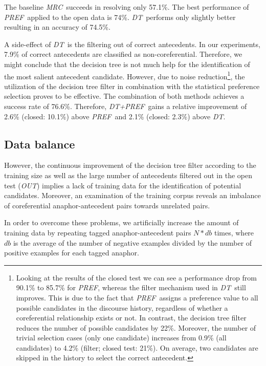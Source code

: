 The baseline {\small\em MRC}\, succeeds in resolving only 57.1\%. The best performance of 
{\small\em PREF}\, applied to the open data is 74\%. 
{\small\em DT}\, performs only slightly better resulting in an accuracy of 74.5\%.

A side-effect of {\small\em DT}\, is the filtering out of correct
antecedents. In our experiments, 7.9\% of correct antecedents are classified
as non-coreferential.
Therefore, we might conclude that the decision tree is not much help for the
identification of the most salient antecedent candidate.
However, due to noise reduction\footnote{
Looking at the results of the closed test we can see a performance drop from 90.1\% to
85.7\% for {\small\em PREF}, whereas the filter mechanism used in {\small\em DT}\, 
still improves. This is due to the fact that {\small\em PREF}\, assigns a preference value
to all possible candidates in the discourse history, regardless of whether a coreferential relationship exists
or not. In contrast, the decision tree filter reduces the number of possible candidates by 22\%.
Moreover, the number of trivial selection cases (only one candidate) increases from 0.9\% (all candidates) to
4.2\% (filter; closed test: 21\%). On average, two candidates are skipped in the history
to select the correct antecedent.},
the utilization of the decision tree filter in combination with the statistical
preference selection proves to be effective. The combination of both methods achieves a success rate
of 76.6\%. Therefore, {\small\em DT+PREF}\, gains a relative improvement of 2.6\% (closed: 10.1\%)
above {\small\em PREF}\, and 2.1\% (closed: 2.3\%) above {\small\em DT}.

\subsection{Data balance}

However, the continuous improvement of the decision tree filter according to the training size
as well as the large number of antecedents filtered out in the open test ({\em OUT}) 
implies a lack of training data for the identification of potential candidates.
Moreover, an examination of the training corpus reveals an imbalance of coreferential
anaphor-antecedent pairs towards unrelated pairs.

In order to overcome these problems, we artificially increase the amount
of training data by repeating tagged anaphor-antecedent pairs $N*db$ times, where $db$ is the
average of the number of negative examples divided by the number of positive examples for each
tagged anaphor.

